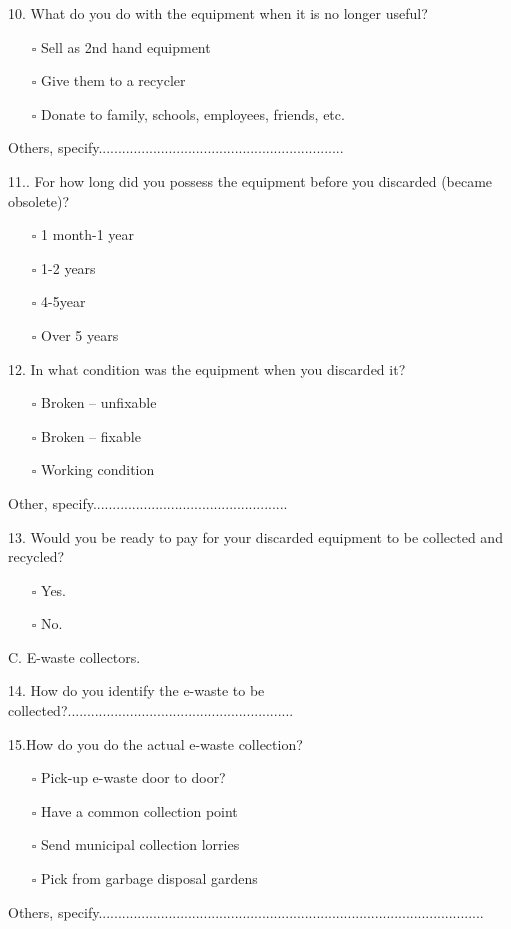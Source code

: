 \documentclass{article}
\begin{document}
10. What do you do with the equipment when it is no longer useful?
\begin{itemize}
\item[$\square$]Sell as 2nd hand equipment
\item[$\square$] Give them to a recycler
\item[$\square$]Donate to family, schools, employees, friends, etc.
\end{itemize}
Others, specify...............................................................

11.. For how long did you possess the equipment before you discarded (became
obsolete)?
\begin{itemize}
\item[$\square$]1 month-1 year
\item[$\square$] 1-2 years
\item[$\square$]4-5year
\item[$\square$]Over 5 years
\end{itemize}

12. In what condition was the equipment when you discarded it?
\begin{itemize}
\item[$\square$]Broken – unfixable
\item[$\square$] Broken – fixable
\item[$\square$]Working condition
\end{itemize}
Other, specify..................................................


13. Would you be ready to pay for your discarded equipment to be collected and
recycled?
\begin{itemize}
\item[$\square$]Yes.
\item[$\square$] No.
\end{itemize}

 C. E-waste collectors.

14. How do you identify the e-waste to be collected?..........................................................

15.How do you do the actual e-waste collection?
\begin{itemize}
\item[$\square$]Pick-up e-waste door to door?
\item[$\square$] Have a common collection point
\item[$\square$]Send municipal collection lorries
\item[$\square$]Pick from garbage disposal gardens
\end{itemize}
Others, specify...................................................................................................
\end{document}
